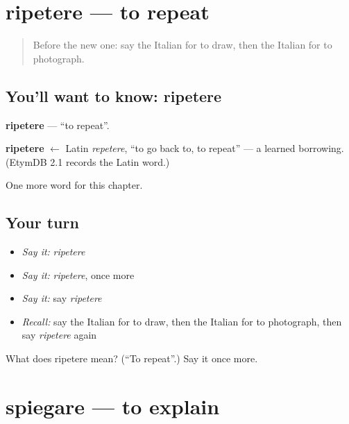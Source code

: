 \section[ripetere]{ripetere — to repeat}

\label{lesson:IT-C141-ripetere}



\begin{quote}
Before the new one: say the Italian for to draw, then the Italian for to photograph.
\end{quote}

\subsection*{You'll want to know: ripetere}
\textbf{ripetere} — \textquotedblleft{}to repeat\textquotedblright{}.

\begin{cousinweb}
\textbf{ripetere} $\leftarrow$ Latin \emph{repetere}, \textquotedblleft{}to go back to, to repeat\textquotedblright{} — a learned borrowing. (EtymDB 2.1 records the Latin word.)
\end{cousinweb}

\begin{grammarlens}[title={What you've built}]
One more word for this chapter.
\end{grammarlens}

\subsection*{Your turn}
\begin{itemize}
\raggedright
  \item \emph{Say it:} \emph{ripetere}
  \item \emph{Say it:} \emph{ripetere}, once more
  \item \emph{Say it:} say \emph{ripetere}
  \item \emph{Recall:} say the Italian for to draw, then the Italian for to photograph, then say \emph{ripetere} again
\end{itemize}

\begin{tcolorbox}[breakable,colback=teal!4,colframe=teal!35!black,title={Before you move on}]
What does ripetere mean? (\textquotedblleft{}To repeat\textquotedblright{}.) Say it once more.
\end{tcolorbox}
\section[spiegare]{spiegare — to explain}

